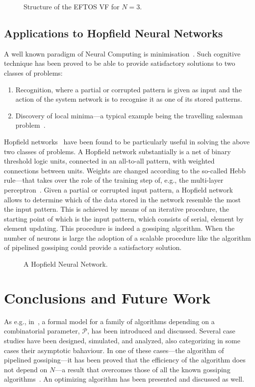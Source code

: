\documentclass{elsart}
\begin{document}
\begin{figure}
\centerline{}
\caption{Structure of the EFTOS VF for $N=3$.}\label{ronew}
\end{figure}


\subsection{Applications to Hopfield Neural Networks}\label{s.hop}
A well known paradigm of Neural Computing is minimisation~\cite{SFK97}. Such cognitive technique
has been proved to be able to provide satisfactory solutions to two classes of problems:
\begin{enumerate}                       
\item Recognition, where a partial or corrupted pattern is given as input and the action of
      the system network is to recognise it as one of its stored patterns.
\item Discovery of local minima---a typical example being the travelling salesman
      problem~\cite{HT85}.
\end{enumerate}

Hopfield networks~\cite{Hop82,Roj96} have been found to be particularly useful in solving the
above two classes of problems. A Hopfield network substantially is a net of
binary threshold logic units, connected in an all-to-all pattern,
with weighted connections between units. Weights are changed according to the
so-called Hebb rule---that takes over the role of the training step of, e.g.,
the multi-layer perceptron~\cite{Ros58}. Given a partial or corrupted input pattern,
a Hopfield network allows to determine which of the data stored in the network
resemble the most the input pattern. This is achieved by means of an iterative
procedure, the starting point of which is the input pattern, which consists of
serial, element by element updating. This procedure is indeed a
gossiping algorithm. When the number of neurons is large the adoption of
a scalable procedure like the algorithm of pipelined gossiping could provide
a satisfactory solution.
\begin{figure}
\centerline{}
\caption{A Hopfield Neural Network.}\label{fig:hop}
\end{figure}


\section{Conclusions and Future Work}\label{end}
As e.g., in~\cite{DeFl96}, a formal model for a family of algorithms depending on a
combinatorial parameter, $\mathcal P$, has been introduced and discussed.
Several case studies have been designed, simulated, and analyzed, 
also categorizing in some cases their asymptotic bahaviour.
In one of these cases---the algorithm of pipelined gossiping---it has been proved
that the efficiency of the algorithm does not depend on $N$---a result that
overcomes those of all the known gossiping algorithms~\cite{KruCV92,Hrom96}.
An optimizing algorithm has been presented and discussed as well.
\end{document}
